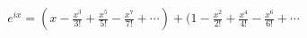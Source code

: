 \documentclass[preview]{standalone}
\begin{document}
\begin{align*}
e^{ix}= (x-\frac{x^3}{3!}+\frac{x^5}{5!}-\frac{x^7}{7!}+\cdots)+(1-\frac{x^2}{2!}+\frac{x^4}{4!}-\frac{x^6}{6!}+\cdots
\end{align*}
\end{document}
